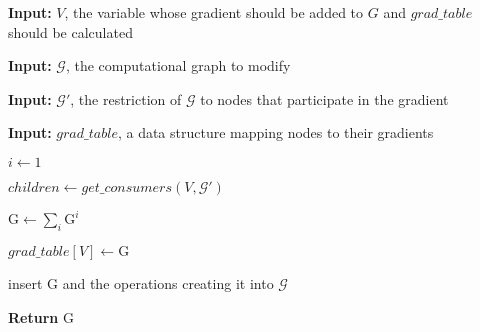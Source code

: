 \documentclass{article}
\begin{document}
    \setlength{\interspacetitleruled}{-.4pt}
    \begin{algorithm}

    
    \textbf{Input:}
    $V$, the variable whose gradient should be added to $G$ and $grad\_table$ should be calculated

    \textbf{Input:}
    $\mathcal{G}$, the computational graph to modify
	
    \textbf{Input:}
    $\mathcal{G}'$, the restriction of $\mathcal{G}$ to nodes that participate in the gradient
    
	\textbf{Input:}
    $grad\_table$, a data structure mapping nodes to their gradients
    
    
	
	$i \gets 1$
	
	$children \gets get\_consumers(V, \mathcal{G}')$
	
	
	$\mathrm{G} \gets \sum_{i}\mathrm{G}^{i}$
	
	$grad\_table[V] \gets \mathrm{G}$
	
	insert $\mathrm{G}$ and the operations creating it into $\mathcal{G}$
	
	\textbf{Return} $\mathrm{G}$
    
    \end{algorithm}    
    
\end{document}
